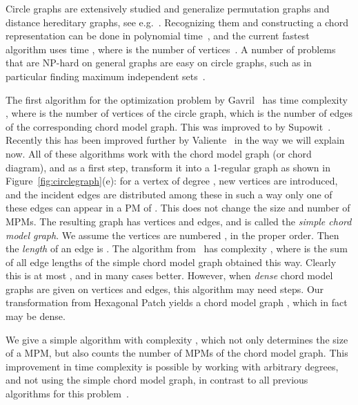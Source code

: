 \documentclass{llncs}
\begin{document}
Circle graphs are extensively studied and generalize permutation graphs and distance hereditary graphs, see e.g.~\cite{BLS99}. Recognizing them and constructing a chord representation can be done in polynomial time~\cite{Bou87,GSH89}, and the current fastest algorithm uses time , where  is the number of vertices~\cite{Spi94}. A number of problems that are NP-hard on general graphs are easy on circle graphs, such as in particular finding maximum independent sets~\cite{Gav73,Sup87,Val03,NLG09}. 



The first algorithm for the optimization problem by Gavril~\cite{Gav73} has time complexity , where  is the number of vertices of the circle graph, which is the number of edges of the corresponding chord model graph.
This was improved to  by Supowit~\cite{Sup87}. Recently this has been improved further by Valiente~\cite{Val03} in the way we will explain now. 
All of these algorithms work with the chord model graph (or chord diagram), and as a first step, transform it into a 1-regular graph as shown in Figure~\ref{fig:circlegraph}(e):
for a vertex of degree ,  new vertices are introduced, and the  incident edges are distributed among these in such a way only one of these edges can appear in a PM of . This does not change the size and number of MPMs. The resulting graph  has  vertices and  edges, and is called the {\em simple chord model graph}. We assume the vertices are numbered , in the proper order. Then the {\em length} of an edge  is . The algorithm from~\cite{Val03} has complexity , where  is the sum of all edge lengths of the simple chord model graph obtained this way. Clearly this is at most , and in many cases better. However, when {\em dense} chord model graphs are given on  vertices and  edges, this algorithm may need  steps. 
Our transformation from Hexagonal Patch yields a chord model graph , which in fact may be dense.

We give a simple algorithm with complexity , which not only determines the size of a MPM, but also counts the number of MPMs of the chord model graph. 
This improvement in time complexity is possible by working with arbitrary degrees, and not using the simple chord model graph, in contrast to all previous algorithms for this problem~\cite{Val03}.
\end{document}
